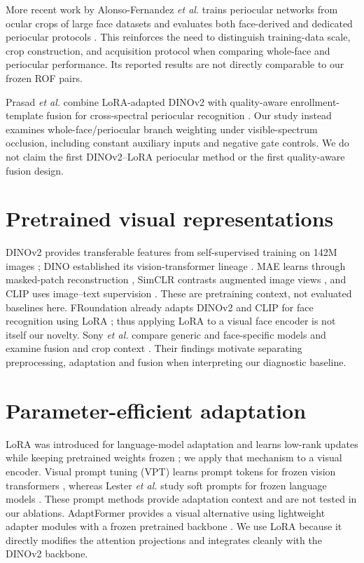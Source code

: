 \documentclass[12pt,a4paper,oneside]{report}
\begin{document}
More recent work by Alonso-Fernandez \textit{et al.} trains periocular networks from ocular crops of large face datasets and evaluates both face-derived and dedicated periocular protocols \cite{ocularcrop2025}. This reinforces the need to distinguish training-data scale, crop construction, and acquisition protocol when comparing whole-face and periocular performance. Its reported results are not directly comparable to our frozen ROF pairs.

Prasad \textit{et al.} combine LoRA-adapted DINOv2 with quality-aware enrollment-template fusion for cross-spectral periocular recognition \cite{perilora2026}. Our study instead examines whole-face/periocular branch weighting under visible-spectrum occlusion, including constant auxiliary inputs and negative gate controls. We do not claim the first DINOv2--LoRA periocular method or the first quality-aware fusion design.

\section{Pretrained visual representations}
DINOv2 provides transferable features from self-supervised training on 142M images \cite{dinov2}; DINO established its vision-transformer lineage \cite{dino}. MAE learns through masked-patch reconstruction \cite{mae}, SimCLR contrasts augmented image views \cite{simclr}, and CLIP uses image--text supervision \cite{clip}. These are pretraining context, not evaluated baselines here. FRoundation already adapts DINOv2 and CLIP for face recognition using LoRA \cite{froundation2025}; thus applying LoRA to a visual face encoder is not itself our novelty. Sony \textit{et al.} compare generic and face-specific models and examine fusion and crop context \cite{foundationcomparison2025}. Their findings motivate separating preprocessing, adaptation and fusion when interpreting our diagnostic baseline.

\section{Parameter-efficient adaptation}
LoRA was introduced for language-model adaptation and learns low-rank updates while keeping pretrained weights frozen \cite{lora}; we apply that mechanism to a visual encoder. Visual prompt tuning (VPT) learns prompt tokens for frozen vision transformers \cite{vpt}, whereas Lester \textit{et al.} study soft prompts for frozen language models \cite{prompt}. These prompt methods provide adaptation context and are not tested in our ablations. AdaptFormer provides a visual alternative using lightweight adapter modules with a frozen pretrained backbone \cite{adaptformer}. We use LoRA because it directly modifies the attention projections and integrates cleanly with the DINOv2 backbone.
\end{document}
